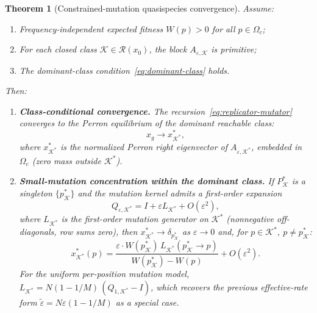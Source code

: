 \documentclass[12pt]{article}
\newtheorem{theorem}{Theorem}[section]
\begin{document}
\begin{theorem}[Constrained-mutation quasispecies convergence]\label{thm:quasispecies}
Assume:
\begin{enumerate}[label=(\roman*)]
\item Frequency-independent expected fitness $W(p) > 0$ for all $p \in \Omega_c$;
\item For each closed class $\mathcal{K} \in \mathcal{R}(x_0)$, the block $A_{\varepsilon,\mathcal{K}}$ is primitive;
\item The dominant-class condition~\eqref{eq:dominant-class} holds.
\end{enumerate}
Then:

\begin{enumerate}[label=(\alph*)]
\item \textbf{Class-conditional convergence.} The recursion~\eqref{eq:replicator-mutator} converges to the Perron equilibrium of the dominant reachable class:
\[
x_g \to x^*_{\mathcal{K}^*},
\]
where $x^*_{\mathcal{K}^*}$ is the normalized Perron right eigenvector of $A_{\varepsilon,\mathcal{K}^*}$, embedded in $\Omega_c$ (zero mass outside $\mathcal{K}^*$).

\item \textbf{Small-mutation concentration within the dominant class.} If $P^*_\mathcal{K}$ is a singleton $\{p^*_\mathcal{K}\}$ and the mutation kernel admits a first-order expansion
\[
Q_{\varepsilon,\mathcal{K}^*} = I + \varepsilon L_{\mathcal{K}^*} + O(\varepsilon^2),
\]
where $L_{\mathcal{K}^*}$ is the first-order mutation generator on $\mathcal{K}^*$ (nonnegative off-diagonals, row sums zero),
then $x^*_{\mathcal{K}^*} \to \delta_{p^*_\mathcal{K}}$ as $\varepsilon \to 0$ and, for $p \in \mathcal{K}^*$, $p \ne p^*_\mathcal{K}$:
\begin{equation}\label{eq:small-mutation}
x^*_{\mathcal{K}^*}(p) = \frac{\varepsilon \cdot W(p^*_\mathcal{K})\, L_{\mathcal{K}^*}(p^*_\mathcal{K} \to p)}{W(p^*_\mathcal{K}) - W(p)} + O(\varepsilon^2).
\end{equation}
For the uniform per-position mutation model, $L_{\mathcal{K}^*} = N(1 - 1/M)\,(Q_{1,\mathcal{K}^*} - I)$, which recovers the previous effective-rate form $\tilde{\varepsilon} = N\varepsilon(1 - 1/M)$ as a special case.


\end{enumerate}
\end{theorem}
\end{document}
